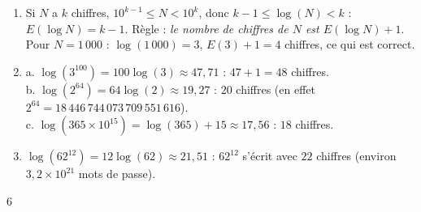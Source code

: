 {\begin{enumerate}
\begin{enumerate}[label=\alph*.]
\item $E(\log N)=14$, et $14+1=15$ chiffres.
\end{enumerate}
\item Si $N$ a $k$ chiffres, $10^{k-1}\leqslant N<10^k$, donc $k-1\leqslant\log(N)<k$ : $E(\log N)=k-1$. Règle : \emph{le nombre de chiffres de $N$ est $E(\log N)+1$}. Pour $N=1\,000$ : $\log(1\,000)=3$, $E(3)+1=4$ chiffres, ce qui est correct.
\item a. $\log(3^{100})=100\log(3)\approx47{,}71$ : $47+1=48$ chiffres.\\
b. $\log(2^{64})=64\log(2)\approx19{,}27$ : $20$ chiffres (en effet $2^{64}=18\,446\,744\,073\,709\,551\,616$).\\
c. $\log(365\times10^{15})=\log(365)+15\approx17{,}56$ : $18$ chiffres.
\item $\log(62^{12})=12\log(62)\approx21{,}51$ : $62^{12}$ s'écrit avec $22$ chiffres (environ $3{,}2\times10^{21}$ mots de passe).
\end{enumerate}
}{6}

